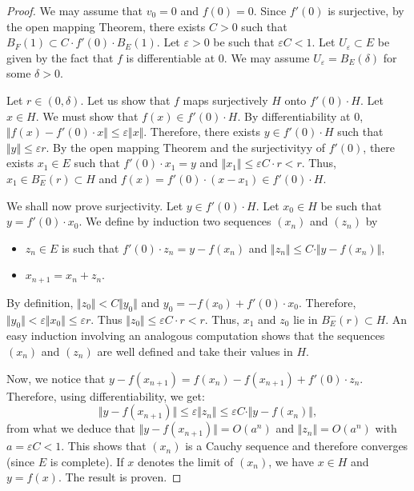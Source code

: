\documentclass{amsart}
\begin{document}
\begin{proof}
We may assume that $v_0=0$ and $f(0)=0$. Since $f'(0)$ is surjective, by 
the open mapping Theorem, there exists $C>0$ such that $B_F(1) \subset 
C \cdot f'(0) \cdot B_E(1)$. Let $\varepsilon>0$ be such that 
$\varepsilon C < 1$. Let $U_\varepsilon \subset E$ be given by the fact 
that $f$ is differentiable at $0$. We may assume $U_\varepsilon = 
B_E(\delta)$ for some $\delta >0$.

Let $r \in (0, \delta)$.
Let us show that $f$ maps surjectively $H$ onto $f'(0) \cdot H$.
Let $x \in H$. We must show that $f(x) \in f'(0) \cdot H$. 
By differentiability at $0$, $\Vert f(x)-f'(0) \cdot x \Vert \leq 
\varepsilon \Vert x \Vert $. Therefore, there exists $y \in f'(0) \cdot 
H$ such that 
$\Vert y \Vert \leq \varepsilon r$. By the open mapping Theorem and the 
surjectivityy of $f'(0)$, there exists $x_1 \in E$ such that $f'(0) \cdot 
x_1 =y$ and $\Vert x_1 \Vert \leq \varepsilon C \cdot r < r$. Thus, $x_1 
\in B^-_E(r) \subset H$ and $f(x)= f'(0) \cdot (x-x_1) \in f'(0) 
\cdot H$.

We shall now prove surjectivity. Let $y \in f'(0) \cdot H$. 
Let $x_0 \in H$ be such that $y = f'(0) \cdot x_0$.
We define by induction two sequences $(x_n)$ and $(z_n)$ by
\begin{itemize}
\item $z_n \in E$ is such that
$f'(0) \cdot z_n = y - f(x_n)$ and
$\Vert z_n \Vert \leq C \cdot \Vert y - f(x_n) \Vert$,
\item $x_{n+1}=x_n+z_n$.
\end{itemize}
By definition, $\Vert z_0 \Vert < C \Vert y_0\Vert$ and $y_0 
= -f(x_0)+f'(0) \cdot x_0$. Therefore, $\Vert y_0 \Vert < \varepsilon 
\Vert x_0 \Vert \leq \varepsilon r$. Thus $\Vert z_0 \Vert \leq 
\varepsilon C \cdot r < r$. Thus, $x_1$ and $z_0$ lie in $B^-_E(r) 
\subset H$. An easy induction involving an analogous computation
shows that the sequences $(x_n)$ and $(z_n)$ are well defined and
take their values in $H$.

Now, we notice that
$y - f(x_{n+1}) = f(x_n) - f(x_{n+1}) + f'(0) \cdot z_n$.
Therefore, using differentiability, we get:
$$\Vert y  - f(x_{n+1}) \Vert 
\leq \varepsilon \Vert z_n \Vert \leq \varepsilon C \cdot \Vert 
y - f(x_n) \Vert,$$
from what we deduce that $\Vert y - f(x_{n+1}) \Vert = 
O(a^n)$ and $\Vert z_n \Vert = O(a^n)$ with $a = \varepsilon C < 1$.
This shows that $(x_n)$ is a Cauchy sequence and therefore converges 
(since $E$ is complete). If $x$ denotes the limit of $(x_n)$, we have
$x \in H$ and $y=f(x)$. The result is proven.
\end{proof}
\end{document}
